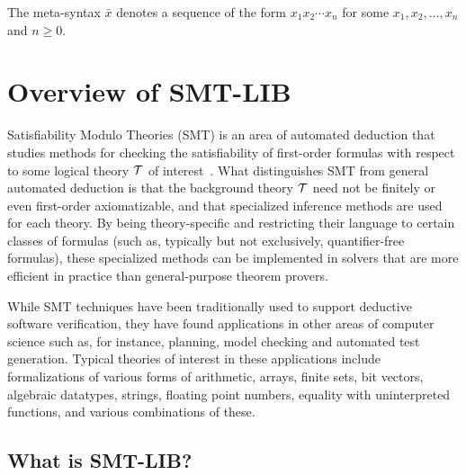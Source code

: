 The meta-syntax $\bar{x}$ denotes a sequence of the form $x_1 x_2 \cdots x_n$
for some $x_1, x_2, \ldots, x_n$ and $n \geq 0$.


\section{Overview of SMT-LIB}

Satisfiability Modulo Theories (SMT) is an area of automated deduction 
that studies methods for checking the satisfiability of first-order formulas 
with respect to some logical theory $\mathcal{T}$ of interest~\cite{BarSST-09}.
What distinguishes SMT from general automated 
deduction is that the background theory $\mathcal{T}$ need not be finitely or even first-order 
axiomatizable, and that specialized inference methods are used for each theory. 
By being theory-specific and restricting their language to certain classes 
of formulas (such as, typically but not exclusively, quantifier-free formulas), 
these specialized methods can be implemented in solvers 
that are more efficient in practice than general-purpose theorem provers. 

While SMT techniques have been traditionally 
used to support deductive software verification, they have found applications 
in other areas of computer science such as, for instance, planning, model checking and 
automated test generation. 
Typical theories of interest in these applications
include formalizations of various forms of arithmetic, arrays, finite sets, 
bit vectors, algebraic datatypes, strings, floating point numbers,
equality with uninterpreted functions, and various combinations of these.


\subsection{What is SMT-LIB?}



